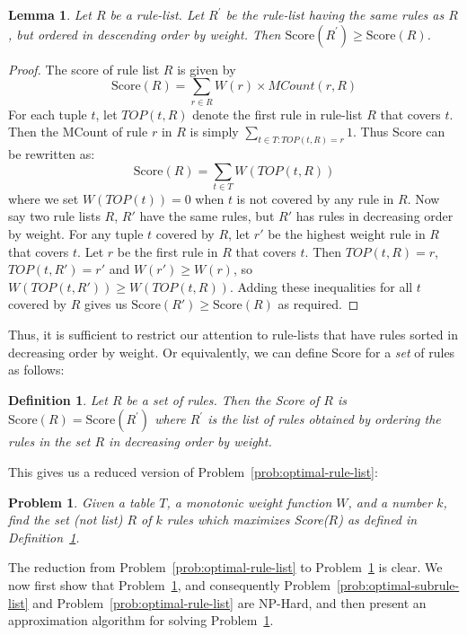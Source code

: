 \documentclass[10pt,journal,compsoc]{IEEEtran}
\newtheorem{lemma}{Lemma}
\newtheorem{definition}{Definition}
\newcounter{prob}
\newtheorem{problem}[prob]{Problem}
\newcommand{\eat}[1]{}
\newcommand{\papertext}[1]{#1}
\begin{document}
\begin{lemma}\label{lemma:rule-ordering}
Let $R$ be a rule-list. Let $R^{\prime}$ be the rule-list having the same rules as $R$, but ordered in descending order by weight. Then
$\text{Score}(R^{\prime}) \geq \text{Score}(R)$.
\end{lemma}
\eat{The proof of this lemma, as well as other proofs, can be found in the technical report~\cite{tr}.}\papertext{
\begin{proof}
The score of rule list $R$ is given by $$\text{Score}(R) = \sum_{r \in R} W(r) \times MCount(r,R)$$
For each tuple $t$, let $TOP(t,R)$ denote the first rule in rule-list $R$ that covers $t$. Then the MCount of rule $r$ in $R$ is simply $\sum_{t \in T : TOP(t,R) = r} 1$. Thus Score can be rewritten as:
$$\text{Score}(R) = \sum_{t \in T} W(TOP(t,R))$$
where we set $W(TOP(t)) = 0$ when $t$ is not covered by any rule in $R$. Now say two rule lists $R$, $R'$ have the same rules, but $R'$ has rules in decreasing order by weight. For any tuple $t$ covered by $R$, let $r'$ be the highest weight rule in $R$ that covers $t$. Let $r$ be the first rule in $R$ that covers $t$. Then $TOP(t,R) = r$, $TOP(t, R') = r'$ and $W(r') \geq W(r)$, so $W(TOP(t,R')) \geq W(TOP(t,R))$. Adding these inequalities for all $t$ covered by $R$ gives us $\text{Score}(R') \geq \text{Score}(R)$ as required.
\end{proof}
}
Thus, it is sufficient to restrict our attention to rule-lists that have rules sorted in decreasing order by weight. Or equivalently, we can define Score for a \emph{set} of rules as follows:

\begin{definition}\label{def:set-score}
Let $R$ be a set of rules. Then the Score of $R$ is
$\text{Score}(R) = \text{Score}(R^{\prime})$
where $R^{\prime}$ is the list of rules obtained by ordering the rules in the set $R$ in decreasing order by weight.
\end{definition}

This gives us a reduced version of Problem~\ref{prob:optimal-rule-list}: 
\begin{problem}\label{prob:optimal-rule-set}
Given a table $T$, a monotonic weight function $W$, and a number $k$, find the set (not list) $R$ of $k$ rules which maximizes Score($R$) as defined in Definition~\ref{def:set-score}.
\end{problem}

\noindent The reduction from Problem~\ref{prob:optimal-rule-list} to Problem~\ref{prob:optimal-rule-set} is clear. We now first show that Problem~\ref{prob:optimal-rule-set}, and consequently Problem~\ref{prob:optimal-subrule-list} and Problem~\ref{prob:optimal-rule-list} are {\sc NP-Hard}, and then present an approximation algorithm for solving Problem~\ref{prob:optimal-rule-set}.
\end{document}
